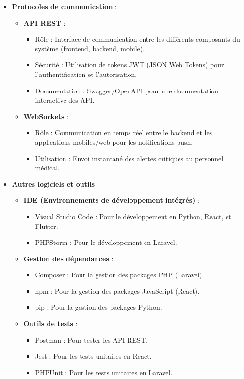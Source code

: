 \begin{itemize}
    \item \textbf{Protocoles de communication} :
    \begin{itemize}
        \item \textbf{API REST} :
            \begin{itemize}
                \item Rôle : Interface de communication entre les différents composants du système (frontend, backend, mobile).
                \item Sécurité : Utilisation de tokens JWT (JSON Web Tokens) pour l'authentification et l'autorisation.
                \item Documentation : Swagger/OpenAPI pour une documentation interactive des API.
            \end{itemize}
        \item \textbf{WebSockets} :
            \begin{itemize}
                \item Rôle : Communication en temps réel entre le backend et les applications mobiles/web pour les notifications push.
                \item Utilisation : Envoi instantané des alertes critiques au personnel médical.
            \end{itemize}
    \end{itemize}

    \item \textbf{Autres logiciels et outils} :
    \begin{itemize}
        \item \textbf{IDE (Environnements de développement intégrés)} :
            \begin{itemize}
                \item Visual Studio Code : Pour le développement en Python, React, et Flutter.
                \item PHPStorm : Pour le développement en Laravel.
            \end{itemize}
        \item \textbf{Gestion des dépendances} :
            \begin{itemize}
                \item Composer : Pour la gestion des packages PHP (Laravel).
                \item npm : Pour la gestion des packages JavaScript (React).
                \item pip : Pour la gestion des packages Python.
            \end{itemize}
        \item \textbf{Outils de tests} :
            \begin{itemize}
                \item Postman : Pour tester les API REST.
                \item Jest : Pour les tests unitaires en React.
                \item PHPUnit : Pour les tests unitaires en Laravel.
            \end{itemize}
    \end{itemize}
\end{itemize}